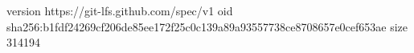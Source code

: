 version https://git-lfs.github.com/spec/v1
oid sha256:b1fdf24269cf206de85ee172f25c0c139a89a93557738ce8708657e0cef653ae
size 314194

